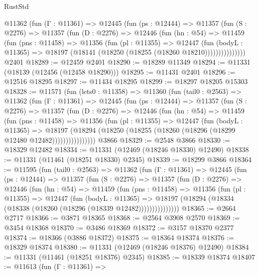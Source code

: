 \begin{lexlean}{RustStd}
\begin{coremodule}
        @11362
          (fun (Γ : @11361) =>
          @12445
            (fun (ps : @12444) =>
            @11357
              (fun (S : @2276) =>
              @11357
                (fun (D : @2276) =>
                @12446
                  (fun (hn : @54) =>
                  @11459
                    (fun (pns : @11458) =>
                    @11356
                      (fun (pl : @11355) =>
                      @12447
                        (fun (bodyL : @11365) =>
                        @18197 (@18141 (@18250 (@18255 (@18260 @18210)))))))))))))))
    @2401
@18289 := @12459 @2401
@18290 := @18289 @11349
@18294 := @11331 (@18139 (@12456 (@12458 @18290)))
@18295 := @11431 @2401
@18296 := @12516 @18295
@18297 := @11434 @18295
@18299 := @18297 @18205 @15303
@18328 := @11571
    (fun (lets0 : @11358) =>
    @11360
      (fun (tail0 : @2563) =>
      @11362
        (fun (Γ : @11361) =>
        @12445
          (fun (ps : @12444) =>
          @11357
            (fun (S : @2276) =>
            @11357
              (fun (D : @2276) =>
              @12446
                (fun (hn : @54) =>
                @11459
                  (fun (pns : @11458) =>
                  @11356
                    (fun (pl : @11355) =>
                    @12447
                      (fun (bodyL : @11365) =>
                      @18197
                        (@18294
                          (@18250 (@18255 (@18260 (@18296 (@18299 @12480 @12482))))))))))))))))
    @3866
@18329 := @2548 @3866
@18330 := @18329 @12482
@18334 := @11331 (@12469 (@18246 @18330) @12490)
@18338 := @11331 (@11461 (@18251 @18330) @2345)
@18339 := @18299 @3866
@18364 := @11595
    (fun (tail0 : @2563) =>
    @11362
      (fun (Γ : @11361) =>
      @12445
        (fun (ps : @12444) =>
        @11357
          (fun (S : @2276) =>
          @11357
            (fun (D : @2276) =>
            @12446
              (fun (hn : @54) =>
              @11459
                (fun (pns : @11458) =>
                @11356
                  (fun (pl : @11355) =>
                  @12447
                    (fun (bodyL : @11365) =>
                    @18197 (@18294 (@18334 (@18338 (@18260 (@18296 (@18339 @12482)))))))))))))))
@18365 := @2664 @2717
@18366 := @3871 @18365
@18368 := @2564 @3908 @2570
@18369 := @3454 @18368
@18370 := @3486 @18369
@18372 := @3157 @18370 @2377
@18374 := @18366 (@3886 @18372)
@18375 := @18364 @18374
@18376 := @18329 @18374
@18380 := @11331 (@12469 (@18246 @18376) @12490)
@18384 := @11331 (@11461 (@18251 @18376) @2345)
@18385 := @18339 @18374
@18407 := @11613
    (fun (Γ : @11361) =>

\end{coremodule}
\end{lexlean}
